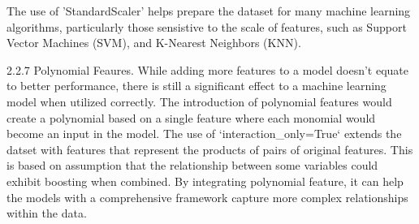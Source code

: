 The use of 'StandardScaler' helps prepare the dataset for many machine learning algorithms, particularly those sensistive to the scale of features, such as Support Vector Machines (SVM), and K-Nearest Neighbors (KNN). 

2.2.7 Polynomial Feaures. While adding more features to a model doesn't equate to better performance, there is still a significant effect to a machine learning model when utilized correctly. The introduction of polynomial features would create a polynomial based on a single feature where each monomial would become an input in the model. The use of `interaction_only=True` extends the datset with features that represent the products of pairs of original features. This is based on assumption that the relationship between some variables could exhibit boosting when combined. By integrating polynomial feature, it can help the models with a comprehensive framework capture more complex relationships within the data.

